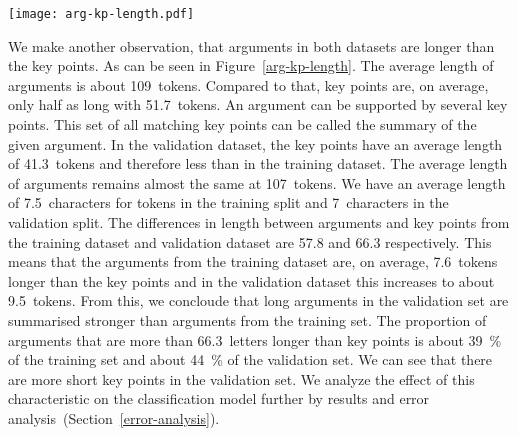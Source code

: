 \begin{figure*}
    \centering
    \texttt{[image: arg-kp-length.pdf]}
    \label{arg-kp-length}
    \caption{Differences in argument and key point lengths in the training and development set.}
\end{figure*}

We make another observation, that arguments in both datasets are longer than the key points. As can be seen in Figure~\ref{arg-kp-length}. 
The average length of arguments is about 109~tokens. Compared to that, key points are, on average, only half as long with 51.7~tokens.
An argument can be supported by several key points. This set of all matching key points can be called the summary of the given argument.  
In the validation dataset, the key points have an average length of 41.3~tokens and therefore less than in the training dataset. 
The average length of arguments remains almost the same at 107~tokens. 
We have an average length of 7.5~characters for tokens in the training split and 7~characters in the validation split. 
The differences in length between arguments and key points from the training dataset and validation dataset are 57.8 and 66.3 respectively. 
This means that the arguments from the training dataset are, on average, 7.6~tokens longer than the key points and 
in the validation dataset this increases to about 9.5~tokens. 
From this, we concloude that long arguments in the validation set are summarised stronger than arguments from the training set. 
The proportion of arguments that are more than 66.3~letters longer than key points is about 39~\% of the training set 
and about 44~\% of the validation set. 
We can see that there are more short key points in the validation set. 
We analyze the effect of this characteristic on the classification model further by results and error analysis~(Section~\ref{error-analysis}).
